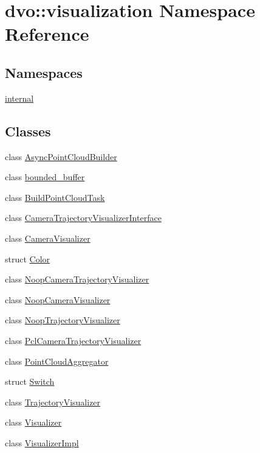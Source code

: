 \hypertarget{namespacedvo_1_1visualization}{}\section{dvo\+:\+:visualization Namespace Reference}
\label{namespacedvo_1_1visualization}
\subsection*{Namespaces}
\begin{DoxyCompactItemize}
\item 
 \mbox{\hyperlink{namespacedvo_1_1visualization_1_1internal}{internal}}
\end{DoxyCompactItemize}
\subsection*{Classes}
\begin{DoxyCompactItemize}
\item 
class \mbox{\hyperlink{classdvo_1_1visualization_1_1_async_point_cloud_builder}{Async\+Point\+Cloud\+Builder}}
\item 
class \mbox{\hyperlink{classdvo_1_1visualization_1_1bounded__buffer}{bounded\+\_\+buffer}}
\item 
class \mbox{\hyperlink{classdvo_1_1visualization_1_1_build_point_cloud_task}{Build\+Point\+Cloud\+Task}}
\item 
class \mbox{\hyperlink{classdvo_1_1visualization_1_1_camera_trajectory_visualizer_interface}{Camera\+Trajectory\+Visualizer\+Interface}}
\item 
class \mbox{\hyperlink{classdvo_1_1visualization_1_1_camera_visualizer}{Camera\+Visualizer}}
\item 
struct \mbox{\hyperlink{structdvo_1_1visualization_1_1_color}{Color}}
\item 
class \mbox{\hyperlink{classdvo_1_1visualization_1_1_noop_camera_trajectory_visualizer}{Noop\+Camera\+Trajectory\+Visualizer}}
\item 
class \mbox{\hyperlink{classdvo_1_1visualization_1_1_noop_camera_visualizer}{Noop\+Camera\+Visualizer}}
\item 
class \mbox{\hyperlink{classdvo_1_1visualization_1_1_noop_trajectory_visualizer}{Noop\+Trajectory\+Visualizer}}
\item 
class \mbox{\hyperlink{classdvo_1_1visualization_1_1_pcl_camera_trajectory_visualizer}{Pcl\+Camera\+Trajectory\+Visualizer}}
\item 
class \mbox{\hyperlink{classdvo_1_1visualization_1_1_point_cloud_aggregator}{Point\+Cloud\+Aggregator}}
\item 
struct \mbox{\hyperlink{structdvo_1_1visualization_1_1_switch}{Switch}}
\item 
class \mbox{\hyperlink{classdvo_1_1visualization_1_1_trajectory_visualizer}{Trajectory\+Visualizer}}
\item 
class \mbox{\hyperlink{classdvo_1_1visualization_1_1_visualizer}{Visualizer}}
\item 
class \mbox{\hyperlink{classdvo_1_1visualization_1_1_visualizer_impl}{Visualizer\+Impl}}
\end{DoxyCompactItemize}
